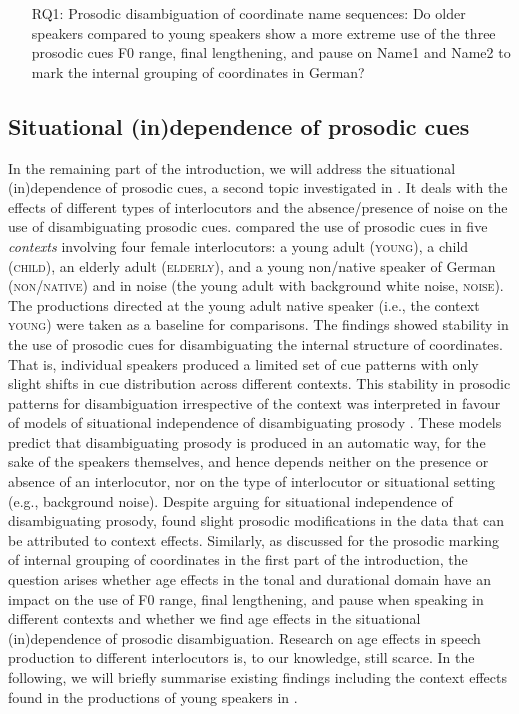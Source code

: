 \documentclass[output=paper]{langscibook}
\begin{document}
\begin{enumerate}
    \item[RQ1:] Prosodic disambiguation of coordinate name sequences: Do older speakers compared to young speakers show a more extreme use of the three prosodic cues F0 range, final lengthening, and pause on Name1 and Name2 to mark the internal grouping of coordinates in German?
\end{enumerate}


\subsection{Situational (in)dependence of prosodic cues}\label{independence}
\begin{sloppypar}
In the remaining part of the introduction, we will address the situational (in)de\-pen\-dence of prosodic cues, a second topic investigated in \citet{huttenlauchetal2021}. It deals with the effects of different types of interlocutors and the absence\fshyp presence of noise on the use of disambiguating prosodic cues. \citet{huttenlauchetal2021} compared the use of prosodic cues in five \textit{contexts} involving four female interlocutors: a young adult (\textsc{young}), a child (\textsc{child}), an elderly adult (\textsc{elderly}), and a young non\-/native speaker of German (\textsc{non\-/native}) and in noise (the young adult with background white noise, \textsc{noise}). The productions directed at the young adult native speaker (i.e., the context \textsc{young}) were taken as a baseline for comparisons. The findings showed stability in the use of prosodic cues for disambiguating the internal structure of coordinates. That is, individual speakers produced a limited set of cue patterns with only slight shifts in cue distribution across different contexts. This stability in prosodic patterns for disambiguation irrespective of the context was interpreted in favour of models of situational independence of disambiguating prosody \citep{schafer_intonational_2000,kraljic_prosodic_2005, speer_situationally_2011}. These models predict that disambiguating prosody is produced in an automatic way, for the sake of the speakers themselves, and hence depends neither on the presence or absence of an interlocutor, nor on the type of interlocutor or situational setting (e.g., background noise). Despite arguing for situational independence of disambiguating prosody, \citet{huttenlauchetal2021} found slight prosodic modifications in the data that can be attributed to context effects. Similarly, as discussed for the prosodic marking of internal grouping of coordinates in the first part of the introduction, the question arises whether age effects in the tonal and durational domain have an impact on the use of F0 range, final lengthening, and pause when speaking in different contexts and whether we find age effects in the situational (in)de\-pen\-dence of prosodic disambiguation. Research on age effects in speech production to different interlocutors is, to our knowledge, still scarce. In the following, we will briefly summarise existing findings including the context effects found in the productions of young speakers in \citet{huttenlauchetal2021}. 
\end{sloppypar}
\end{document}
